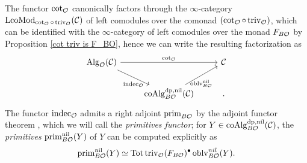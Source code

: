The functor $\cot_{{\mathcal{O}}}$ canonically factors through the $\infty$-category $\operatorname{LcoMod}_{\cot_{{\mathcal{O}}}\circ \operatorname{triv}_{{\mathcal{O}}}}({\mathcal{C}})$ of left comodules over the comonad $(\cot_{{\mathcal{O}}}\circ \operatorname{triv}_{{\mathcal{O}}})$, which can be identified with the $\infty$-category of left comodules over the monad $F_{B{\mathcal{O}}}$ by Proposition \ref{cot triv is F_BO}, hence we can write the resulting factorization as
\[
\begin{tikzcd}
     \Alg_{\CO}(\CC) &   & 
     \CC\\
                     & \coAlg^{\divpow, \nil}_{B\CO}(\CC) &
    \arrow[from = 1-1, to = 1-3, "\cot_{\CO}"]
    \arrow[from = 1-1, to = 2-2, "\indec_{\CO}" below, outer sep=3pt]
    \arrow[from = 2-2, to = 1-3, "\oblv_{B\CO}^{\nil}" below, outer sep=3pt].
\end{tikzcd}
\]
The functor $\operatorname{indec}_{{\mathcal{O}}}$ admits a right adjoint $\operatorname{prim}_{B{\mathcal{O}}}$ by the adjoint functor theorem \cite[Corollary 5.5.2.9.]{HTT}, which we will call the \emph{primitives functor};
for $Y \in \operatorname{coAlg}^{\operatorname{dp}, \operatorname{nil}}_{B{\mathcal{O}}}({\mathcal{C}})$, the \emph{primitives} $\operatorname{prim}_{B{\mathcal{O}}}^{\operatorname{nil}}(Y)$ of $Y$ can be computed explicitly as \cite[Lemma 4.7]  {Heuts_Koszul}
$$
\operatorname{prim}_{B{\mathcal{O}}}^{\operatorname{nil}}(Y) \simeq \operatorname{\operatorname{Tot}} \operatorname{triv}_{{\mathcal{O}}} (F_{B{\mathcal{O}}})^{\bullet} \operatorname{oblv}^{nil}_{B{\mathcal{O}}} (Y).
$$

